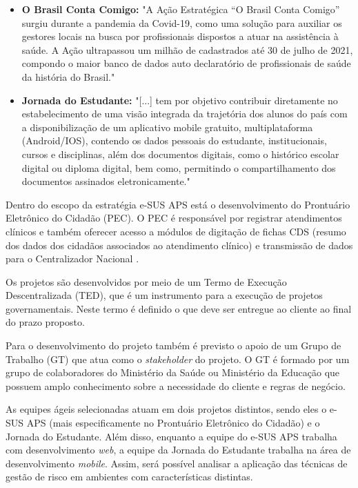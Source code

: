 \documentclass[
    12pt,       %
    openright,      %
    twoside,      %
    a4paper,      %
    english,      %
    french,       %
    spanish,      %
    brazil,       %
    ]{abntex2}
\begin{document}
\begin{itemize}
    \item \textbf{O Brasil Conta Comigo:} "A Ação Estratégica “O Brasil Conta Comigo” surgiu durante a pandemia da Covid-19, como uma solução para auxiliar os gestores locais na busca por profissionais dispostos a atuar na assistência à saúde. A Ação ultrapassou um milhão de cadastrados até 30 de julho de 2021, compondo o maior banco de dados auto declaratório de profissionais de saúde da história do Brasil."
    
    \item \textbf{Jornada do Estudante:} "[...] tem por objetivo contribuir diretamente no estabelecimento de uma visão integrada da trajetória dos alunos do país com a disponibilização de um aplicativo mobile gratuito, multiplataforma (Android/IOS), contendo os dados pessoais do estudante, institucionais, cursos e disciplinas, além dos documentos digitais, como o histórico escolar digital ou diploma digital, bem como, permitindo o compartilhamento dos documentos assinados eletronicamente." \cite{MEC:2021}
\end{itemize}

Dentro do escopo da estratégia e-SUS APS está o desenvolvimento do Prontuário Eletrônico do Cidadão (PEC). O PEC é responsável por registrar atendimentos clínicos e também oferecer acesso a módulos de digitação de fichas CDS (resumo dos dados dos cidadãos associados ao atendimento clínico) e transmissão de dados para o Centralizador Nacional \cite{Bridge:2022}.

Os projetos são desenvolvidos por meio de um Termo de Execução Descentralizada (TED), que é um instrumento para a execução de projetos governamentais. Neste termo é definido o que deve ser entregue ao cliente ao final do prazo proposto. 

Para o desenvolvimento do projeto também é previsto o apoio de um Grupo de Trabalho (GT) que atua como o \textit{stakeholder} do projeto. O GT é formado por um grupo de colaboradores do Ministério da Saúde ou Ministério da Educação que possuem amplo conhecimento sobre a necessidade do cliente e regras de negócio.

As equipes ágeis selecionadas atuam em dois projetos distintos, sendo eles o e-SUS APS (mais especificamente no Prontuário Eletrônico do Cidadão) e o Jornada do Estudante. Além disso, enquanto a equipe do e-SUS APS trabalha com desenvolvimento \textit{web}, a equipe da Jornada do Estudante trabalha na área de desenvolvimento \textit{mobile}. Assim, será possível analisar a aplicação das técnicas de gestão de risco em ambientes com características distintas.
\end{document}
